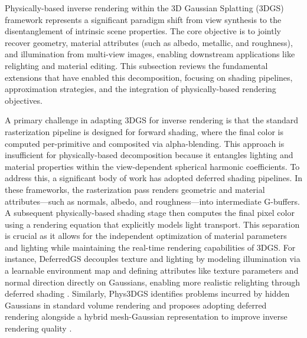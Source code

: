\documentclass[11pt]{article}
\begin{document}
Physically-based inverse rendering within the 3D Gaussian Splatting (3DGS) framework represents a significant paradigm shift from view synthesis to the disentanglement of intrinsic scene properties. The core objective is to jointly recover geometry, material attributes (such as albedo, metallic, and roughness), and illumination from multi-view images, enabling downstream applications like relighting and material editing. This subsection reviews the fundamental extensions that have enabled this decomposition, focusing on shading pipelines, approximation strategies, and the integration of physically-based rendering objectives.

A primary challenge in adapting 3DGS for inverse rendering is that the standard rasterization pipeline is designed for forward shading, where the final color is computed per-primitive and composited via alpha-blending. This approach is insufficient for physically-based decomposition because it entangles lighting and material properties within the view-dependent spherical harmonic coefficients. To address this, a significant body of work has adopted deferred shading pipelines. In these frameworks, the rasterization pass renders geometric and material attributes---such as normals, albedo, and roughness---into intermediate G-buffers. A subsequent physically-based shading stage then computes the final pixel color using a rendering equation that explicitly models light transport. This separation is crucial as it allows for the independent optimization of material parameters and lighting while maintaining the real-time rendering capabilities of 3DGS. For instance, DeferredGS decouples texture and lighting by modeling illumination via a learnable environment map and defining attributes like texture parameters and normal direction directly on Gaussians, enabling more realistic relighting through deferred shading \cite{ref565}. Similarly, Phys3DGS identifies problems incurred by hidden Gaussians in standard volume rendering and proposes adopting deferred rendering alongside a hybrid mesh-Gaussian representation to improve inverse rendering quality \cite{ref566}.
\end{document}
